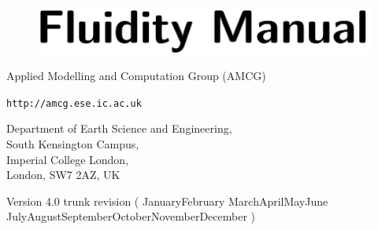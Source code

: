 \documentclass[11pt,a4paper]{book}
\def\today{\number\day\space\ifcase\month\or
 January\or February \or March\or April\or May\or June\or
 July\or August\or September\or October\or November\or December\fi
 \space\number\year}
\begin{document}


\frontmatter

\begin{titlepage}

\begin{center}

\mbox{}

\vfill


\begin{figure}[h]
\centering
\includegraphics[]{misc_images/manual_title.pdf}
\end{figure}


\vspace{40mm}

{\LARGE
Applied Modelling and Computation Group (AMCG)
\\}

\vspace{1mm}


{\LARGE
\lstinline[language=html]+http://amcg.ese.ic.ac.uk+
\\}

\vspace{10mm}

{\LARGE
Department of Earth Science and Engineering,\\
South Kensington Campus,\\
Imperial College London,\\
London, SW7 2AZ, UK
\\}



\vspace{80mm}


{\Large
Version 4.0 trunk revision  (\today)
\\}

\vfill

\end{center}



\end{titlepage}
\end{document}

